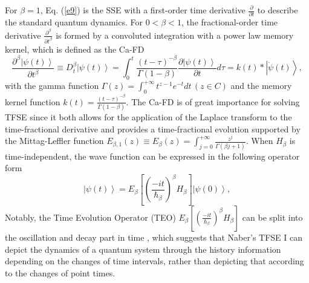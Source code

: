 \documentclass[
showpacs,  %
showkeys,  %
aps,       %
amsthm,    %
amsmath,   %
amsfonts,  %
amssymb    %
]{revtex4-1}          %
\begin{document}
For $\beta=1$, Eq. (\ref{e9}) is the SSE with a first-order time derivative $\frac{\partial }{{\partial t}}$ to describe the standard quantum dynamics. For $0<\beta<1$, the fractional-order time derivative $\frac{{{\partial ^\beta }}}{{\partial {t^\beta }}}$ is formed by a convoluted integration with a power law memory kernel, which is defined as the Ca-FD \cite{Mainardi1996}
\begin{equation}
\label{e10}
\frac{{{\partial ^\beta }\left| {\psi (t)} \right\rangle }}{{\partial {t^\beta }}} \equiv D_t^\beta \left| {\psi (t)} \right\rangle  = \int_0^t {\frac{{{{(t - \tau )}^{ - \beta }}}}{{\Gamma (1 - \beta )}}} \frac{{\partial \left| {\psi (t)} \right\rangle }}{{\partial t}}d\tau  = k(t) * \left| {\dot \psi (t)} \right\rangle,
\end{equation}
with the gamma function $\Gamma(z)=\int_0^{ + \infty}{{t^{z - 1}}}{e^{ - t}}dt\,(z\in C)$ and the memory kernel function $k(t)=\frac{{{{(t-\tau)}^{-\beta }}}}{{\Gamma(1-\beta)}}$. The Ca-FD is of great importance for solving TFSE since it both allows for the application of the Laplace transform to the time-fractional derivative and provides a time-fractional evolution supported by the Mittag-Leffler function ${E_{\beta ,1}}(z) \equiv {E_\beta }(z) = \int_{j = 0}^{ + \infty } {\frac{{{z^j}}}{{\Gamma (\beta j + 1)}}}$. When ${H_\beta}$ is time-independent, the wave function can be expressed in the following operator form \cite{Iomin2009}
\begin{equation}
\label{e11}
\left| {\psi (t)} \right\rangle  = {E_\beta }\left[ {{{(\frac{{ - it}}{\hbar_\beta })}^\beta }{H_\beta }} \right]\left| {\psi (0)} \right\rangle,
\end{equation}
Notably, the Time Evolution Operator (TEO) ${E_\beta}\left[{{{(\frac{{-it}}{\hbar_\beta})}^\beta}{H_\beta}}\right]$ can be split into the oscillation and decay part in time \cite{Naber2004,Iomin2009}, which suggests that Naber's TFSE I can depict the dynamics of a quantum system through the history information depending on the changes of time intervals, rather than depicting that according to the changes of point times.
\end{document}
